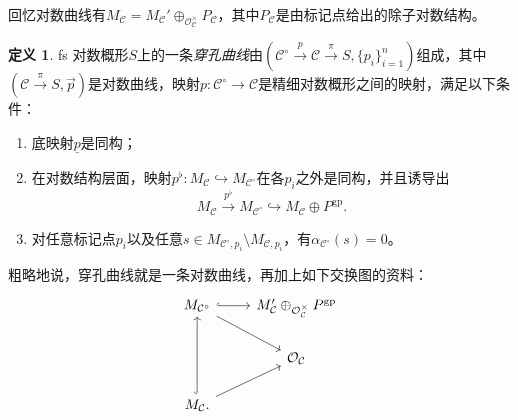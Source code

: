 \documentclass{amsart}
\theoremstyle{definition}
\newtheorem{defn}[thm]{定义}
\theoremstyle{remark}
\theoremstyle{plain}
\theoremstyle{definition}
\theoremstyle{remark}
\newcommand{\mc}[1]{\mathcal{#1}}
\newcommand{\mr}[1]{\mathrm{#1}}
\newcommand{\on}[1]{\operatorname{#1}}
\newcommand{\ul}[1]{\underline{#1}}
\newcommand{\1}{\mathbf{1}}
\newcommand{\2}{\mathbf{2}}
\newcommand{\3}{\mathbf{3}}
\begin{document}
回忆对数曲线有\(M_{\mc{C}} = M_{\mc{C}}' \oplus_{\mc{O}_{\mc{C}}^{\times}} P_{\mc{C}}\)，其中\(P_{\mc{C}}\)是由标记点给出的除子对数结构。

\begin{defn}
    fs 对数概形\(S\)上的一条\textit{穿孔曲线}由\((\mc{C}^{\circ} \xrightarrow{p} \mc{C} \xrightarrow{\pi} S, \{p_i\}_{i=1}^n)\)组成，其中\((\mc{C} \xrightarrow{\pi} S, \vec{p})\)是对数曲线，映射\(p \colon \mc{C}^{\circ} \to \mc{C}\)是精细对数概形之间的映射，满足以下条件：
    \begin{enumerate}
        \item 底映射\(\ul{p}\)是同构；
        \item 在对数结构层面，映射\(p^{\flat} \colon M_{\mc{C}} \hookrightarrow M_{\mc{C}^{\circ}}\)在各\(p_i\)之外是同构，并且诱导出
            \[ M_{\mc{C}} \xrightarrow{p^{\flat}} M_{\mc{C}^{\circ}} \hookrightarrow M_{\mc{C}} \oplus P^{\mr{gp}}. \]
        \item 对任意标记点\(p_i\)以及任意\(s \in M_{\mc{C}^{\circ}, p_i} \setminus M_{\mc{C}, p_i}\)，有\(\alpha_{\mc{C}^{\circ}}(s) = 0\)。
    \end{enumerate}
\end{defn}

粗略地说，穿孔曲线就是一条对数曲线，再加上如下交换图的资料：
\begin{equation*}
\begin{tikzcd}
    M_{\mc{C}^{\circ}} \ar{dr} \ar[hookrightarrow]{r} & M_{\mc{C}}' \oplus_{\mc{O}_{\mc{C}}^{\times}} P^{\on{gp}} \\
    & \mc{O}_{\mc{C}} \\
    M_{\mc{C}} \ar[hookrightarrow]{uu} \ar{ur}.
\end{tikzcd}
\end{equation*}
\end{document}
